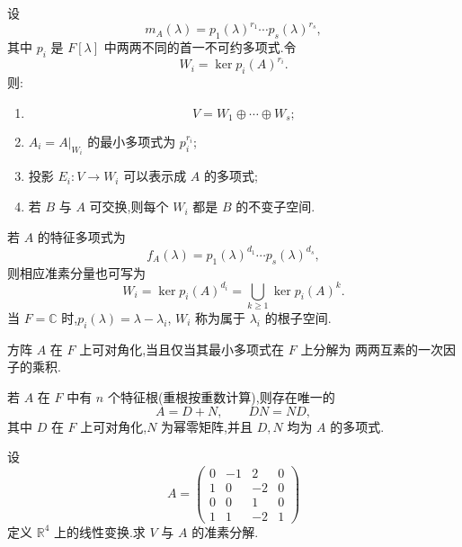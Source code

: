 \begin{theorem}
设
\[
m_A(\lambda)
=
p_1(\lambda)^{r_1}\cdots p_s(\lambda)^{r_s},
\]
其中 $p_i$ 是 $F[\lambda]$ 中两两不同的首一不可约多项式.令
\[
W_i=\ker p_i(A)^{r_i}.
\]
则:
\begin{enumerate}
    \item
    \[
    V=W_1\oplus\cdots\oplus W_s;
    \]
    \item $A_i=A|_{W_i}$ 的最小多项式为 $p_i^{r_i}$;
    \item 投影 $E_i:V\to W_i$ 可以表示成 $A$ 的多项式;
    \item 若 $B$ 与 $A$ 可交换,则每个 $W_i$ 都是 $B$ 的不变子空间.
\end{enumerate}
\end{theorem}

\begin{proposition}[\markstar]
若 $A$ 的特征多项式为
\[
f_A(\lambda)
=
p_1(\lambda)^{d_1}\cdots p_s(\lambda)^{d_s},
\]
则相应准素分量也可写为
\[
W_i
=
\ker p_i(A)^{d_i}
=
\bigcup_{k\geq1}\ker p_i(A)^k.
\]
当 $F=\mathbb{C}$ 时,$p_i(\lambda)=\lambda-\lambda_i$,
$W_i$ 称为属于 $\lambda_i$ 的根子空间.
\end{proposition}

\begin{proposition}[\marktwostar]
方阵 $A$ 在 $F$ 上可对角化,当且仅当其最小多项式在 $F$ 上分解为
两两互素的一次因子的乘积.
\end{proposition}

\begin{proposition}[\markstar]
若 $A$ 在 $F$ 中有 $n$ 个特征根(重根按重数计算),则存在唯一的
\[
A=D+N,
\qquad
DN=ND,
\]
其中 $D$ 在 $F$ 上可对角化,$N$ 为幂零矩阵,并且 $D,N$ 均为 $A$ 的多项式.
\end{proposition}


\begin{example}
设
\[
A=
\begin{pmatrix}
0&-1&2&0\\
1&0&-2&0\\
0&0&1&0\\
1&1&-2&1
\end{pmatrix}
\]
定义 $\mathbb{R}^4$ 上的线性变换.求 $V$ 与 $A$ 的准素分解.
\end{example}
\exampleblank

